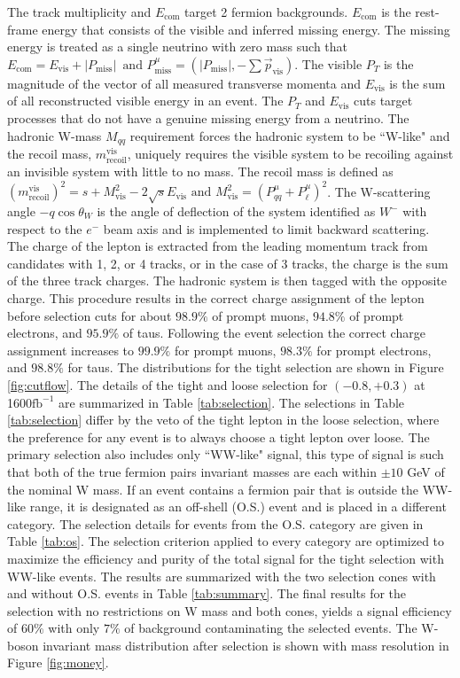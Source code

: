 The track multiplicity and $E_{\text{com}}$ target 2 fermion backgrounds. $E_{\text{com}}$ is the rest-frame energy that consists of the visible and inferred missing energy. The missing energy is treated as a single neutrino with zero mass such that $E_{\text{com}} = E_{\text{vis}} + |P_{\text{miss}}| \, \,  \, \text{and} \, \, P^\mu_{\text{miss}} = (|P_{\text{miss}}| , -\sum{\vec{p}_{\text{vis}}})$. The visible $P_T$ is the magnitude of the vector of all measured transverse momenta and $E_{\text{vis}}$ is the sum of all reconstructed visible energy in an event. The $P_T$ and $E_{\text{vis}}$ cuts target processes that do not have a genuine missing energy from a neutrino. The hadronic W-mass $M_{qq}$ requirement forces the hadronic system to be ``W-like" and the recoil mass, $m_{\text{recoil}}^{\text{vis}}$, uniquely requires the visible system to be recoiling against an invisible system with little to no mass. The recoil mass is defined as $(m_{ \text{recoil}}^{\text{vis}})^2 = s + M^2_{\text{vis}} - 2\sqrt{s}E_{\text{vis}} \, \, \text{and} \, \, M^2_{\text{vis}} = ( P^{\mu}_{qq} +  P^{\mu}_{\ell})^2$. The W-scattering angle $-q\cos\theta_W$ is the angle of deflection of the system identified as $W^-$ with respect to the $e^-$ beam axis and is implemented to limit backward scattering.  The charge of the lepton is extracted from the leading momentum track from candidates with 1, 2, or 4 tracks, or in the case of 3 tracks, the charge is the sum of the three track charges. The hadronic system is then tagged with the opposite charge.  This procedure results in the correct charge assignment of the lepton before selection cuts for about $98.9\%$ of prompt muons, $94.8\%$ of prompt electrons, and $95.9\%$ of taus. Following the event selection the correct charge assignment increases to $99.9\%$ for prompt muons, $98.3\%$ for prompt electrons, and $98.8\%$ for taus. The distributions for the tight selection are shown in Figure \ref{fig:cutflow}. The details of the tight and loose selection for $(-0.8,+0.3)$ at 1600$\text{fb}^{-1}$ are summarized in Table \ref{tab:selection}. The selections in Table \ref{tab:selection} differ by the veto of the tight lepton in the loose selection, where the preference for any event is to always choose a tight lepton over loose. The primary selection also includes only ``WW-like" signal, this type of signal is such that both of the true fermion pairs invariant masses are each within $\pm10$ GeV of the nominal W mass. If an event contains a fermion pair that is outside the WW-like range, it is designated as an off-shell (O.S.) event and is placed in a different category. The selection details for events from the O.S. category are given in Table \ref{tab:os}. The selection criterion applied to every category are optimized to maximize the efficiency and purity of the total signal for the tight selection with WW-like events. The results are summarized with the two selection cones with and without O.S. events in Table \ref{tab:summary}. The final results for the selection with no restrictions on W mass and both cones, yields a signal efficiency of $60\%$ with only $7\%$ of background contaminating the selected events. The W-boson invariant mass distribution after selection is shown with mass resolution in Figure \ref{fig:money}.


